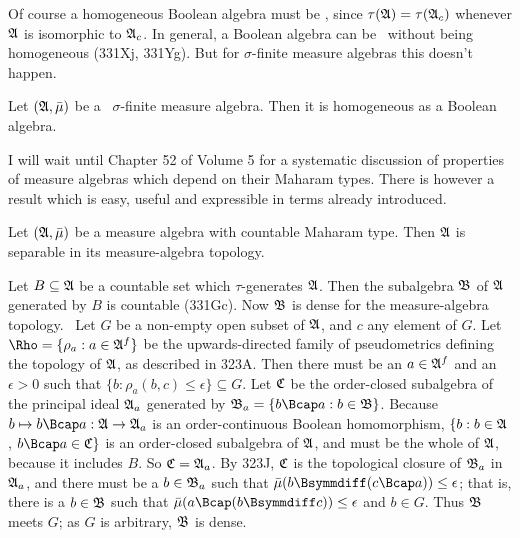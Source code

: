  Of course a homogeneous Boolean
algebra must be
\Mth, since $\tau(\frak A)=\tau(\frak A_c)$ whenever
$\frak A$ is isomorphic to $\frak A_c$.
In general, a Boolean algebra can be \Mth\ without being
homogeneous
(331Xj, 331Yg).   But for $\sigma$-finite measure algebras this doesn't
happen.

 Let $(\frak A,\bar\mu)$ be a \Mth\
$\sigma$-finite measure algebra.   Then it is homogeneous as
a Boolean algebra.


I will wait until Chapter 52 of Volume 5 for a systematic
discussion of properties of measure algebras
which depend on their Maharam
types.   There is however a result which is easy, useful and expressible in
terms already introduced.

\medskip

 Let $(\frak A,\bar\mu)$ be a measure algebra
with countable Maharam type.   Then $\frak A$ is separable in its
measure-algebra topology.

\proof Let $B\subseteq\frak A$ be a countable set which $\tau$-generates
$\frak A$.   Then the subalgebra $\frak B$ of $\frak A$ generated by $B$ is
countable (331Gc).   Now $\frak B$ is dense for the measure-algebra
topology.   \Prf\ Let $G$ be a non-empty open subset of $\frak A$, and $c$
any element of $G$.   Let $\Rho=\{\rho_a:a\in\frak A^f\}$ be the
upwards-directed family of pseudometrics defining the topology of
$\frak A$, as described in 323A.   Then there must be an $a\in\frak A^f$
and an $\epsilon>0$ such that $\{b:\rho_a(b,c)\le\epsilon\}\subseteq G$.
Let $\frak C$ be the order-closed subalgebra of the principal ideal
$\frak A_a$ generated by $\frak B_a=\{b\Bcap a:b\in\frak B\}$.
Because $b\mapsto b\Bcap a:\frak A\to\frak A_a$ is an order-continuous
Boolean homomorphism, $\{b:b\in\frak A$, $b\Bcap a\in\frak C\}$ is
an order-closed subalgebra of $\frak A$, and must be the whole of
$\frak A$, because it includes $B$.   So $\frak C=\frak A_a$.   By 323J,
$\frak C$ is the topological closure of $\frak B_a$ in $\frak A_a$, and
there must be a $b\in\frak B_a$ such that
$\bar\mu(b\Bsymmdiff(c\Bcap a))\le\epsilon$;  that is, there is a
$b\in\frak B$ such that $\bar\mu(a\Bcap(b\Bsymmdiff c))\le\epsilon$ and
$b\in G$.   Thus $\frak B$ meets $G$;  as $G$ is arbitrary, $\frak B$ is
dense.\ \Qed

